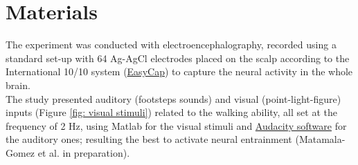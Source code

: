 \section{Materials}
The experiment was conducted with electroencephalography, recorded using a standard set-up with 64 Ag-AgCl electrodes placed on the scalp according to the International 10/10 system (\href{https://www.easycap.de/}{EasyCap}) to capture the neural activity in the whole brain. \\
The study presented auditory (footsteps sounds) and visual (point-light-figure) inputs (Figure \ref{fig: visual stimuli}) related to the walking ability, all set at the frequency of 2 Hz, using Matlab for the visual stimuli and \href{https://www.audacityteam.org/}{Audacity software} for the auditory ones; resulting the best to activate neural entrainment (Matamala-Gomez et al. in preparation).

